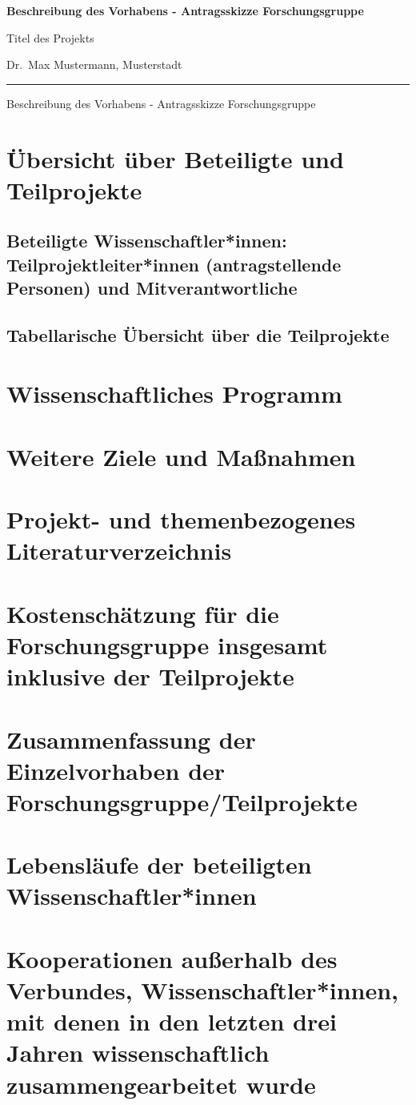 \documentclass{scrartcl}
\newcommand{\spokesperson}{Dr.\ Max Mustermann, Musterstadt}
\newcommand{\project}{Titel des Projekts}
\begin{document}
{\raggedright{} \normalsize \bfseries
	Beschreibung des Vorhabens - Antragsskizze Forschungsgruppe \par
    \project{} \par
    \spokesperson{} \par
	\rule{\textwidth}{0.5pt} \par
	Beschreibung des Vorhabens - Antragsskizze Forschungsgruppe
}

\section{Übersicht über Beteiligte und Teilprojekte}

\subsection{Beteiligte Wissenschaftler*innen: Teilprojektleiter*innen (antragstellende Personen) und Mitverantwortliche}

\subsection{Tabellarische Übersicht über die Teilprojekte}


\section{Wissenschaftliches Programm}


\section{Weitere Ziele und Maßnahmen}


\section{Projekt- und themenbezogenes Literaturverzeichnis}
\printbibliography[heading=none]


\section{Kostenschätzung für die Forschungsgruppe insgesamt inklusive der Teilprojekte}


\section{Zusammenfassung der Einzelvorhaben der Forschungsgruppe/Teilprojekte}


\section{Lebensläufe der beteiligten Wissenschaftler*innen}


\section{Kooperationen außerhalb des Verbundes, Wissenschaftler*innen, mit denen in den letzten drei Jahren wissenschaftlich zusammengearbeitet wurde}
\end{document}
